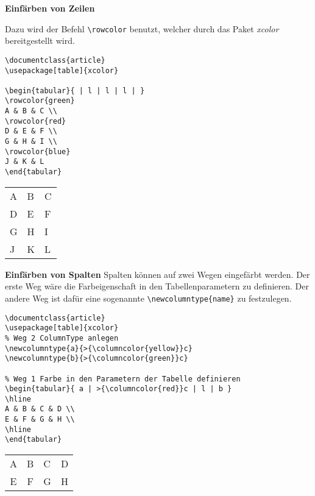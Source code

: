 \textbf{Einfärben von Zeilen}

Dazu wird der Befehl \verb|\rowcolor| benutzt, welcher durch das Paket \emph{xcolor} bereitgestellt wird.

\begin{lstlisting}[style=LaTeX]
\documentclass{article}
\usepackage[table]{xcolor}

\begin{tabular}{ | l | l | l | }
\rowcolor{green}
A & B & C \\
\rowcolor{red}
D & E & F \\
G & H & I \\
\rowcolor{blue}
J & K & L
\end{tabular}

\end{lstlisting}


\begin{tabular}{ | l | l | l | }
	\rowcolor{green}
	A & B & C \\
	\rowcolor{red}
	D & E & F \\
	G & H & I \\
	\rowcolor{blue}
	J & K & L
\end{tabular}

\bigskip %

\textbf{Einfärben von Spalten}
Spalten können auf zwei Wegen eingefärbt werden. Der erste Weg wäre die Farbeigenschaft in den Tabellenparametern zu definieren. Der andere Weg ist dafür eine sogenannte \verb|\newcolumntype{name}| zu festzulegen.

\begin{lstlisting}[style=LaTeX]
\documentclass{article}
\usepackage[table]{xcolor}
% Weg 2 ColumnType anlegen
\newcolumntype{a}{>{\columncolor{yellow}}c}
\newcolumntype{b}{>{\columncolor{green}}c}

% Weg 1 Farbe in den Parametern der Tabelle definieren
\begin{tabular}{ a | >{\columncolor{red}}c | l | b }
\hline
A & B & C & D \\
E & F & G & H \\
\hline
\end{tabular}

\end{lstlisting}
 
 
 \begin{tabular}{ a | >{}c | l | b }
 	\hline
 	A & B & C & D \\
 	E & F & G & H \\
 	\hline
 \end{tabular}

